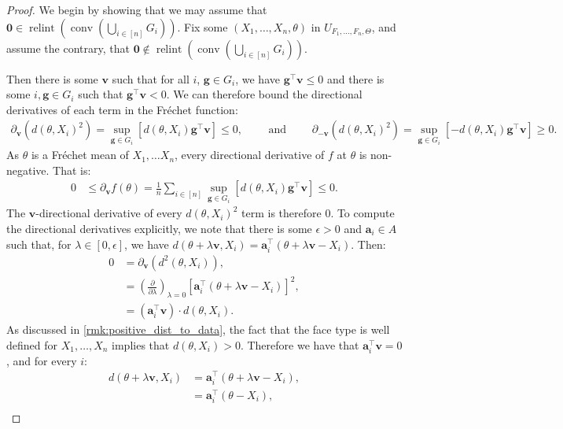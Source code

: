 \documentclass[10pt]{article}
\theoremstyle{definition}
\theoremstyle{remark}
\newcommand{\T}{\intercal}
\newcommand{\CType}{F_1,\dots,F_n}
\newcommand{\sample}{ X_1,\dots, X_n}
\DeclareMathOperator{\conv}{conv}
\DeclareMathOperator{\relint}{relint}
\renewcommand{\vec}[1]{\mathbf{#1}}
\begin{document}
	\begin{proof}
		We begin by showing that we may assume that $\vec 0 \in \relint \left( \conv \left(\textstyle \bigcup_{i \in [n]} G_i \right) \right)$. Fix some $(\sample, \theta)$ in $U_{\CType,\Theta}$, and assume the contrary, that $\vec 0 \notin \relint \left( \conv \left(\textstyle \bigcup_{i \in [n]} G_i \right) \right)$.
		
		Then there is some $\vec v$ such that for all $i$, $\vec g \in G_i$, we have $\vec g^{\T}\vec v\leq 0$ and there is some $i, \vec g \in G_i$ such that $\vec g^{\T}\vec v< 0$. We can therefore bound the directional derivatives of each term in the Fr\'echet function:
		\begin{align*}
			\partial_{\vec v}(d(\theta,X_i)^2) = \sup_{\vec g \in G_i} [d(\theta, X_i)\vec g^{\T}\vec v] \leq 0, \qquad \text{ and } \qquad
			\partial_{-\vec v}(d(\theta,X_i)^2) = \sup_{\vec g \in G_i} [-d(\theta, X_i)\vec g^{\T}\vec v] \geq 0.
		\end{align*}
		As $\theta$ is a Fr\'echet mean of $X_1, \dots X_n$, every directional derivative of $f$ at $\theta$ is non-negative. That is:
		\begin{align*}
			0 &\leq \partial_{\vec v} f(\theta) = \textstyle \frac{1}{n} \sum_{i \in [n]} \sup_{\vec g \in G_i} [d(\theta, X_i)\vec g^{\T}\vec v] \leq 0.
		\end{align*}
		The $\vec v$-directional derivative of every $d(\theta,X_i)^2$ term is therefore $0$. To compute the directional derivatives explicitly, we note that there is some $\epsilon>0$ and $\vec a_i \in A$ such that, for $\lambda \in [0,\epsilon]$, we have $d(\theta+\lambda \vec v,X_i) = \vec a_i^{\T}(\theta + \lambda \vec v - X_i)$. Then:
		\begin{align*}
			0 &= \partial_{\vec v} (d^2(\theta,X_i)), \\
			&= \left(\frac{\partial}{\partial \lambda}\right)_{\lambda = 0} [\vec a_i^{\T}(\theta + \lambda \vec v - X_i)]^2, \\
			&= (\vec a_i^{\T}\vec v) \cdot d(\theta, X_i).
		\end{align*}
		As discussed in \cref{rmk:positive_dist_to_data}, the fact that the face type is well defined for $\sample$ implies that $d(\theta, X_i)>0$. Therefore we have that $\vec a_i^{\T}\vec v = 0$, and for every $i$:
		\begin{align*}
			d(\theta+\lambda \vec v,X_i) &= \vec a_i^{\T}(\theta + \lambda \vec v - X_i), \\
			&= \vec a_i^{\T}(\theta - X_i), \\

\end{align*}
\end{proof}
\end{document}

